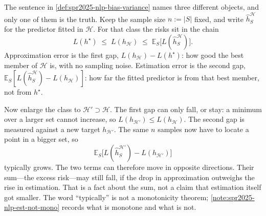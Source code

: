 \documentclass[11pt,a4paper]{article}
\theoremstyle{definition}
\begin{document}
\begin{remark}\label{rem:spr2025-nlp-finer-class}
The sentence in \cref{def:spr2025-nlp-bias-variance} names three different objects, and only one of them is the truth. Keep the sample size \(n:=|S|\) fixed, and write \(\widehat h_S^{\mathcal{H}}\) for the predictor fitted in \(\mathcal{H}\). For that class the risks sit in the chain
\[
L(h^\star)
\;\leq\;
L(h_{\mathcal{H}})
\;\leq\;
\mathbb{E}_S\bigl[L(\widehat h_S^{\mathcal{H}})\bigr].
\]
Approximation error is the first gap, \(L(h_{\mathcal{H}})-L(h^\star)\): how good the best member of \(\mathcal{H}\) is, with no sampling noise. Estimation error is the second gap, \(\mathbb{E}_S[L(\widehat h_S^{\mathcal{H}})-L(h_{\mathcal{H}})]\): how far the fitted predictor is from that best member, not from \(h^\star\).

Now enlarge the class to \(\mathcal{H}'\supset\mathcal{H}\). The first gap can only fall, or stay: a minimum over a larger set cannot increase, so \(L(h_{\mathcal{H}'})\leq L(h_{\mathcal{H}})\). The second gap is measured against a new target \(h_{\mathcal{H}'}\). The same \(n\) samples now have to locate a point in a bigger set, so
\[
\mathbb{E}_S\bigl[L(\widehat h_S^{\mathcal{H}'})-L(h_{\mathcal{H}'})\bigr]
\]
typically grows. The two terms can therefore move in opposite directions. Their sum---the excess risk---may still fall, if the drop in approximation outweighs the rise in estimation. That is a fact about the sum, not a claim that estimation itself got smaller. The word ``typically'' is not a monotonicity theorem; \cref{note:spr2025-nlp-est-not-mono} records what is monotone and what is not.
\end{remark}
\end{document}
